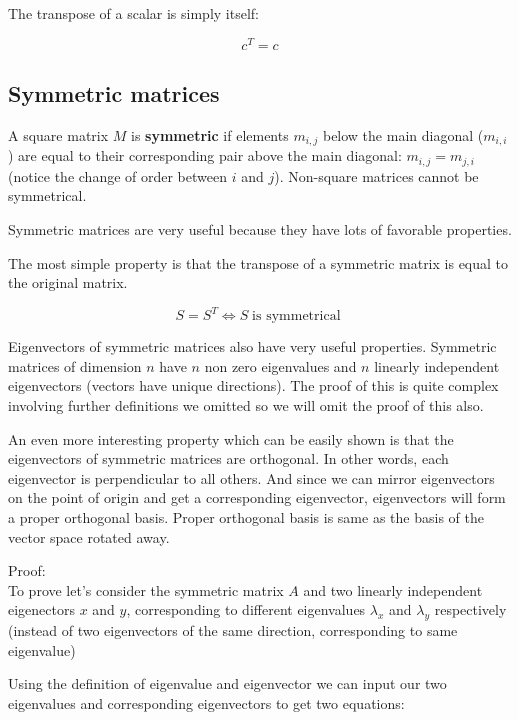 The transpose of a scalar is simply itself:

\[c^T = c\]

\subsection{Symmetric matrices}

A square matrix \(M\) is \textbf{symmetric} if elements \(m_{i,j}\)  below the main diagonal (\(m_{i,i}\)) are equal to their corresponding pair above the main diagonal: \(m_{i,j} = m_{j,i}\) (notice the change of order between \(i\) and \(j\)). Non-square matrices cannot be symmetrical.

Symmetric matrices are very useful because they have lots of favorable properties.

The most simple property is that the transpose of a symmetric matrix is equal to the original matrix.

\[S = S^T \iff S \operatorname{is\ symmetrical}\]

Eigenvectors of symmetric matrices also have very useful properties. Symmetric matrices of dimension \(n\) have \(n\) non zero eigenvalues and \(n\) linearly independent eigenvectors (vectors have unique directions). The proof of this is quite complex involving further definitions we omitted so we will omit the proof of this also.

An even more interesting property which can be easily shown is that the eigenvectors of symmetric matrices are orthogonal. In other words, each eigenvector is perpendicular to all others. And since we can mirror eigenvectors on the point of origin and get a corresponding eigenvector, eigenvectors will form a proper orthogonal basis. Proper orthogonal basis is same as the basis of the vector space rotated away.

Proof:\\

To prove let's consider the symmetric matrix \(A\) and two linearly independent eigenectors \(x\) and \(y\), corresponding to different eigenvalues \(\lambda_x\) and \(\lambda_y\) respectively (instead of two eigenvectors of the same direction, corresponding to same eigenvalue)

Using the definition of eigenvalue and eigenvector we can input our two eigenvalues and corresponding eigenvectors to get two equations:

